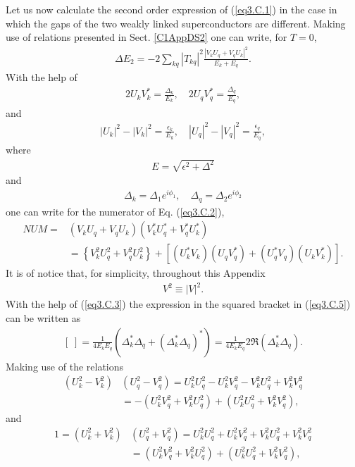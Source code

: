 Let us now calculate the second order expression of  (\ref{eq3.C.1}) in the case in which the gaps of the two weakly linked superconductors are different.
Making use of  relations presented in Sect. \ref{C1AppDS2} one can write, for $T=0$,
\begin{align}\label{eq3.C.2}
\Delta E_2=-2\sum_{kq}|T_{kq}|^2\frac{|V_kU_q+V_qU_k|^2}{E_k+E_q}.
\end{align}
With the help of 
\begin{align}\label{eq3.C.3}
2U_kV_k^*=\frac{\Delta_k}{E_k},\quad 2U_qV_q^*=\frac{\Delta_q}{E_q},
\end{align}
and
\begin{align}
|U_k|^2-|V_k|^2=\frac{\epsilon_k}{E_k},\quad |U_q|^2-|V_q|^2=\frac{\epsilon_q}{E_q},
\end{align}
where
\begin{align}
E=\sqrt{\epsilon^2+\Delta^2}
\end{align}
and 
\begin{align}\label{eq3.C.6}
\Delta_k=\Delta_1e^{i\phi_1},\quad \Delta_q=\Delta_2e^{i\phi_2}
\end{align}
one can write for the numerator of Eq. (\ref{eq3.C.2}),
\begin{align}\label{eq3.C.5}
\nonumber NUM=&\left(V_kU_q+V_qU_k\right)\left(V^*_kU^*_q+V^*_qU^*_k\right)\\
&=\left\{V^2_kU^2_q+V^2_qU^2_k\right\}+\left[(U_k^*V_k)(U_qV^*_q)+(U_q^*V_q)(U_kV^*_k)\right].
\end{align}
It is of notice that, for simplicity, throughout this Appendix
\begin{align}
V^2\equiv|V|^2.
\end{align}
With the help of (\ref{eq3.C.3}) the expression in the squared bracket in (\ref{eq3.C.5}) can be written as 
\begin{align}\label{eq3.C.9}
[\;]=\frac{1}{4E_kE_q}\left(\Delta_k^*\Delta_q+(\Delta_k^*\Delta_q)^*\right)=\frac{1}{4E_kE_q}2\Re(\Delta_k^*\Delta_q).
\end{align}
Making use of the relations
\begin{align}
\nonumber \left(U_k^2-V_k^2\right)&\left(U_q^2-V_q^2\right)=U_k^2U_q^2-U_k^2V_q^2-V_k^2U_q^2+V_k^2V_q^2\\
&=-\left(U_k^2V_q^2+V_k^2U_q^2\right)+\left(U_k^2U_q^2+V_k^2V_q^2\right),
\end{align}
and
\begin{align}
\nonumber 1=\left(U_k^2+V_k^2\right)&\left(U_q^2+V_q^2\right)=U_k^2U_q^2+U_k^2V_q^2+V_k^2U_q^2+V_k^2V_q^2\\
&=\left(U_k^2V_q^2+V_k^2U_q^2\right)+\left(U_k^2U_q^2+V_k^2V_q^2\right),
\end{align}
